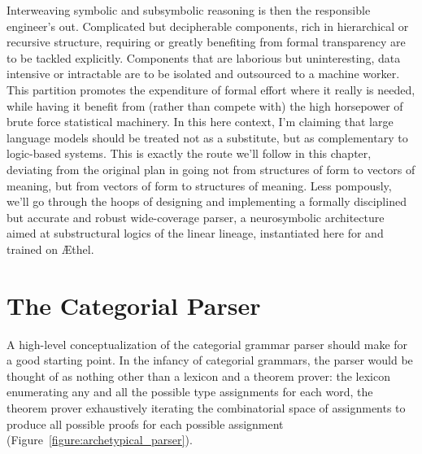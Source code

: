 Interweaving symbolic and subsymbolic reasoning is then the responsible engineer's out.
Complicated but decipherable components, rich in hierarchical or recursive structure, requiring or greatly benefiting from formal transparency are to be tackled explicitly.
Components that are laborious but uninteresting, data intensive or intractable are to be isolated and outsourced to a machine worker.
This partition promotes the expenditure of formal effort where it really is needed, while having it benefit from (rather than compete with) the high horsepower of brute force statistical machinery.
In this here context, I'm claiming that large language models should be treated not as a substitute, but as complementary to logic-based systems.
This is exactly the route we'll follow in this chapter, deviating from the original plan in going not from structures of form to vectors of meaning, but from vectors of form to structures of meaning.
Less pompously, we'll go through the hoops of designing and implementing a formally disciplined but accurate and robust wide-coverage parser, a neurosymbolic architecture aimed at substructural logics of the linear lineage, instantiated here for \NLPplus{} and trained on \AE thel.


\section{The Categorial Parser}
A high-level conceptualization of the categorial grammar parser should make for a good starting point.
In the infancy of categorial grammars, the parser would be thought of as nothing other than a lexicon and a theorem prover: the lexicon enumerating any and all the possible type assignments for each word, the theorem prover exhaustively iterating the combinatorial space of assignments to produce all possible proofs for each possible assignment (Figure~\ref{figure:archetypical_parser}).

